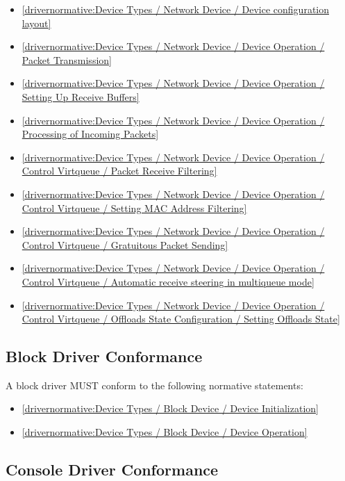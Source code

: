 \begin{itemize}
\item \ref{drivernormative:Device Types / Network Device / Device configuration layout}
\item \ref{drivernormative:Device Types / Network Device / Device Operation / Packet Transmission}
\item \ref{drivernormative:Device Types / Network Device / Device Operation / Setting Up Receive Buffers}
\item \ref{drivernormative:Device Types / Network Device / Device Operation / Processing of Incoming Packets}
\item \ref{drivernormative:Device Types / Network Device / Device Operation / Control Virtqueue / Packet Receive Filtering}
\item \ref{drivernormative:Device Types / Network Device / Device Operation / Control Virtqueue / Setting MAC Address Filtering}
\item \ref{drivernormative:Device Types / Network Device / Device Operation / Control Virtqueue / Gratuitous Packet Sending}
\item \ref{drivernormative:Device Types / Network Device / Device Operation / Control Virtqueue / Automatic receive steering in multiqueue mode}
\item \ref{drivernormative:Device Types / Network Device / Device Operation / Control Virtqueue / Offloads State Configuration / Setting Offloads State}
\end{itemize}

\subsection{Block Driver Conformance}\label{sec:Conformance / Driver Conformance / Block Driver Conformance}

A block driver MUST conform to the following normative statements:

\begin{itemize}
\item \ref{drivernormative:Device Types / Block Device / Device Initialization}
\item \ref{drivernormative:Device Types / Block Device / Device Operation}
\end{itemize}

\subsection{Console Driver Conformance}\label{sec:Conformance / Driver Conformance / Console Driver Conformance}

